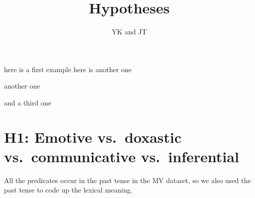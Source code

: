 \documentclass[11pt,fleqn]{article}
\title{Hypotheses}
\author{YK and JT}
\newcommand{\6}{\mbox{$[\hspace*{-.6mm}[$}}
\newcommand{\9}{\mbox{$]\hspace*{-.6mm}]$}}
\begin{document}
\maketitle

\citealt{kiparsky-kiparsky70}

\begin{exe}
\ex here is a first example
\ex here is another one
\begin{xlist}
\ex another
\ex one
\end{xlist}
\ex and a third one
\end{exe}

\section{H1: Emotive vs.\ doxastic vs.\ communicative vs.\ inferential}

All the predicates occur in the past tense in the MV dataset, so we also used the past tense to code up the lexical meaning.
\end{document}
